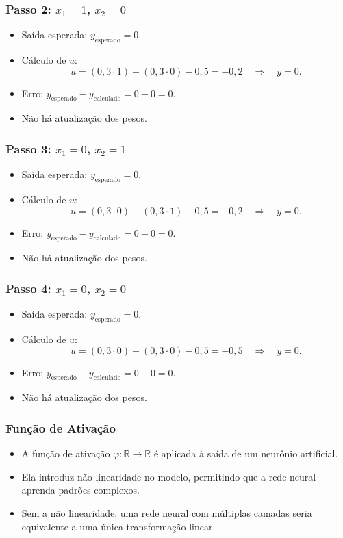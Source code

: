 \documentclass{beamer}
\begin{document}
\begin{frame}
\frametitle{Passo 2: \( x_1 = 1 \), \( x_2 = 0 \)}
\begin{itemize}
    \item Saída esperada: \( y_{\text{esperado}} = 0 \).
    \item Cálculo de \( u \):
    \[
    u = (0,3 \cdot 1) + (0,3 \cdot 0) - 0,5 = -0,2 \quad \Rightarrow \quad y = 0.
    \]
    \item Erro: \( y_{\text{esperado}} - y_{\text{calculado}} = 0 - 0 = 0 \).
    \item Não há atualização dos pesos.
\end{itemize}
\end{frame}

\begin{frame}
\frametitle{Passo 3: \( x_1 = 0 \), \( x_2 = 1 \)}
\begin{itemize}
    \item Saída esperada: \( y_{\text{esperado}} = 0 \).
    \item Cálculo de \( u \):
    \[
    u = (0,3 \cdot 0) + (0,3 \cdot 1) - 0,5 = -0,2 \quad \Rightarrow \quad y = 0.
    \]
    \item Erro: \( y_{\text{esperado}} - y_{\text{calculado}} = 0 - 0 = 0 \).
    \item Não há atualização dos pesos.
\end{itemize}
\end{frame}

\begin{frame}
\frametitle{Passo 4: \( x_1 = 0 \), \( x_2 = 0 \)}
\begin{itemize}
    \item Saída esperada: \( y_{\text{esperado}} = 0 \).
    \item Cálculo de \( u \):
    \[
    u = (0,3 \cdot 0) + (0,3 \cdot 0) - 0,5 = -0,5 \quad \Rightarrow \quad y = 0.
    \]
    \item Erro: \( y_{\text{esperado}} - y_{\text{calculado}} = 0 - 0 = 0 \).
    \item Não há atualização dos pesos.
\end{itemize}
\end{frame}

\begin{frame}
\frametitle{Função de Ativação}
\begin{itemize}
    \item A função de ativação \( \varphi: \mathbb{R} \to \mathbb{R} \) é aplicada à saída de um neurônio artificial.
    \item Ela introduz não linearidade no modelo, permitindo que a rede neural aprenda padrões complexos.
    \item Sem a não linearidade, uma rede neural com múltiplas camadas seria equivalente a uma única transformação linear.
\end{itemize}
\end{frame}
\end{document}
